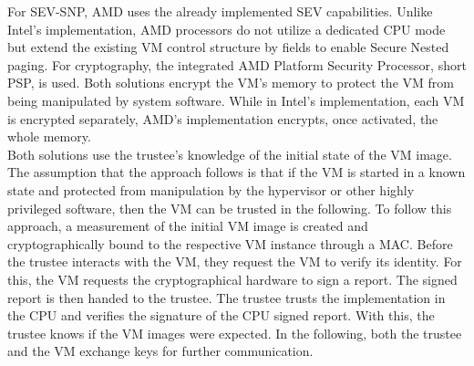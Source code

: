 For SEV-SNP, AMD uses the already implemented SEV capabilities. Unlike Intel's
implementation, AMD processors do not utilize a dedicated CPU mode but extend
the existing VM control structure by fields to enable Secure Nested paging. For
cryptography, the integrated AMD Platform Security Processor, short PSP, is
used. Both solutions encrypt the VM's memory to protect the VM from being
manipulated by system software. While in Intel's implementation, each VM is
encrypted separately, AMD's implementation encrypts, once activated, the whole
memory.\\

Both solutions use the trustee's knowledge of the initial state of the VM image.
The assumption that the approach follows is that if the VM is started in a known
state and protected from manipulation by the hypervisor or other highly
privileged software, then the VM can be trusted in the following. To follow this
approach, a measurement of the initial VM image is created and cryptographically
bound to the respective VM instance through a MAC. Before the trustee interacts
with the VM, they request the VM to verify its identity. For this, the VM
requests the cryptographical hardware to sign a report. The signed report is
then handed to the trustee. The trustee trusts the implementation in the CPU and
verifies the signature of the CPU signed report. With this, the trustee knows if
the VM images were expected. In the following, both the trustee and the VM
exchange keys for further communication.\\

